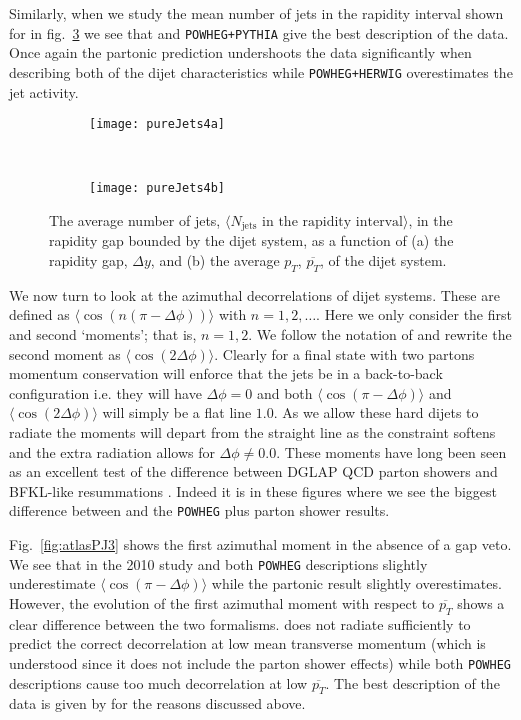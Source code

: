 	Similarly, when we study the mean number of jets in the rapidity interval shown for in
	fig.~\ref{fig:atlasPJ2} we see that \HEJA and \texttt{POWHEG+PYTHIA} give the best
	description of the data.  Once again the partonic \HEJ prediction undershoots the data
	significantly when describing both of the dijet characteristics while \texttt{POWHEG+HERWIG}
	overestimates the jet activity.

	\begin{figure}[bth]
		\begin{subfigure}[b]{0.48\textwidth}
			\texttt{[image: pureJets4a]}
			\caption{}
			\label{fig:}
		\end{subfigure}
		~
		\begin{subfigure}[b]{0.48\textwidth}
			\texttt{[image: pureJets4b]}
			\caption{}
			\label{fig:}
		\end{subfigure}
		\caption{The average number of jets, $\langle N_{\text{jets}}
		\text{ in the rapidity interval}\rangle$, in the rapidity gap
		         bounded by the dijet system, as a function of (a) the
		         rapidity gap, $\Delta y$, and (b) the average $p_T$,
		         $\overline{p_T}$, of the dijet system.}
		\label{fig:atlasPJ2}
	\end{figure}

	We now turn to look at the azimuthal decorrelations of dijet systems.  These are defined
	as $\langle\cos(n(\pi-\Delta\phi))\rangle$ with $n=1, 2, \ldots$.  Here we only consider
	the first and second `moments'; that is, $n=1, 2$.  We follow the notation of \cite{Aad:2014pua}
	and rewrite the second moment as $\langle\cos(2\Delta\phi)\rangle$.  Clearly for a final state
	with two partons momentum conservation will enforce that the jets be in a back-to-back configuration
	i.e. they will have $\Delta \phi=0$ and both $\langle\cos(\pi-\Delta\phi)\rangle$ and
	$\langle\cos(2\Delta\phi)\rangle$ will simply be a flat line $1.0$.  As we allow these hard
	dijets to radiate the moments will depart from the straight line as the constraint softens
	and the extra radiation allows for $\Delta\phi\neq0.0$.  These moments have long been seen
	as an excellent test of the difference between DGLAP QCD parton showers and BFKL-like
	resummations \cite{Ducloue:2012bm}.  Indeed it is in these figures where we see the biggest
	difference between \HEJ and the \texttt{POWHEG} plus parton shower results.

	Fig.~\eqref{fig:atlasPJ3} shows the first azimuthal moment in the absence of a gap veto.
	We see that in the 2010 study \HEJA and both \texttt{POWHEG} descriptions slightly
	underestimate $\langle\cos(\pi-\Delta\phi)\rangle$ while the partonic \HEJ result slightly
	overestimates.  However, the evolution of the first azimuthal moment with respect to
	$\overline{p_T}$ shows a clear difference between the two formalisms.  \HEJ does not
	radiate sufficiently to predict the correct decorrelation at low mean transverse momentum
	(which is understood since it does not include the parton shower effects) while both
	\texttt{POWHEG} descriptions cause too much decorrelation at low $\overline{p_T}$.
	The best description of the data is given by \HEJA for the reasons discussed above.

